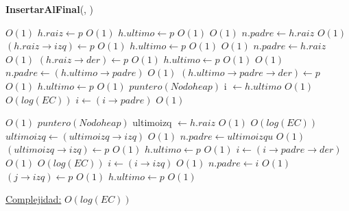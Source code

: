 \begin{Algoritmos}
\begin{algorithm}[H]{\textbf{InsertarAlFinal}(, )}
    	\begin{algorithmic}[1]
			 \Comment $O(1)$
    		\State $h.raiz \gets p$ \Comment $O(1)$
    		\State $h.ultimo \gets p$ \Comment $O(1)$
    	\Else
    		 \Comment $O(1)$
    			\State $n.padre \gets h.raiz$ \Comment $O(1)$
    			\State $(h.raiz \rightarrow izq) \gets p$ \Comment $O(1)$
    			\State $h.ultimo \gets p$    \Comment $O(1)$
    		\Else
    			 \Comment $O(1)$
    				\State $n.padre \gets h.raiz$ \Comment $O(1)$
    				\State $(h.raiz \rightarrow der) \gets p$ \Comment $O(1)$
    				\State $h.ultimo \gets p$ \Comment $O(1)$
    			\Else
    				 \Comment $O(1)$
    					\State $n.padre \gets (h.ultimo \rightarrow padre)$ \Comment $O(1)$
    					\State $(h.ultimo \rightarrow padre \rightarrow der) \gets p$ \Comment $O(1)$
    					\State $h.ultimo \gets p$ \Comment $O(1)$
    				\Else
						\State $puntero(Nodoheap)$ i $\gets h.ultimo$    				 \Comment $O(1)$	
    					 \Comment $O(log(EC))$
    						\State $i \gets (i \rightarrow padre)$ \Comment $O(1)$
    					
    					\EndWhile
    					 \Comment $O(1)$
    						\State $puntero(Nodoheap)$ ultimoizq $\gets h.raiz$ \Comment $O(1)$
    						 \Comment $O(log(EC))$
    							\State $ultimoizq \gets (ultimoizq \rightarrow izq)$ \Comment $O(1)$
    						\EndWhile
    						\State $n.padre \gets ultimoizqu$ \Comment $O(1)$
    						\State $(ultimoizq \rightarrow izq) \gets p$ \Comment $O(1)$
    						\State $h.ultimo \gets p$ \Comment $O(1)$
    					\Else
    						\State $i \gets (i \rightarrow padre \rightarrow der)$ \Comment $O(1)$
    						 \Comment $O(log(EC))$
    							\State $i \gets (i \rightarrow izq)$ \Comment $O(1)$
    						\EndWhile
    						\State $n.padre \gets i$ \Comment $O(1)$
    						\State $(j \rightarrow izq) \gets p$ \Comment $O(1)$
    						\State $h.ultimo \gets p$ \Comment $O(1)$
    					\EndIf
    				\EndIf		
    			\EndIf	    	
	    	\EndIf
		\EndIf

			\medskip
			\Statex \underline{Complejidad:} $O(log(EC))$
    	\end{algorithmic}   	
\end{algorithm} $ $\newline
$ $\newline
$ $\newline
$ $\newline
$ $\newline
$ $\newline
$ $\newline
$ $\newline
$ $\newline
$ $\newline


\end{Algoritmos}
